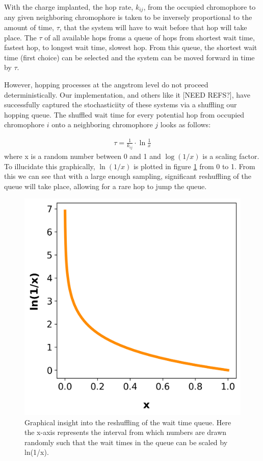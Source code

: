 With the charge implanted, the hop rate, $k_{ij}$, from the occupied chromophore to any
given neighboring chromophore is taken to be
inversely proportional to the amount of time, $\tau$, that the system will have to wait before that hop will
take place. The $\tau$ of all available hops froms a queue of hops from shortest wait time, fastest hop, to
longest wait time, slowest hop. From this queue, the shortest wait time (first choice) can be selected
and the system can be moved forward in time by $\tau$.

However, hopping processes at the angstrom level do not proceed deterministically. 
Our implementation, and others like it [NEED REFS?], have
successfully captured the stochasticiity of these systems via a shuffling our hopping queue.
The shuffled wait time for every potential hop from occupied chromophore $i$ onto a
neighboring chromophore $j$ looks as follows:

\begin{align}
    \tau = \frac{1}{k_{ij}} \cdot \ln{\frac{1}{x}} 
\end{align}
where x is a random number between 0 and 1 and $\log{(1/x)}$ is a scaling factor. To illucidate this
graphically, $\ln{(1/x)}$ is plotted in figure \ref{fig:ln} from 0 to 1. From this we can see that with
a large enough sampling, significant reshuffling of the queue will take place, allowing for a rare hop to jump
the queue.

\begin{figure}
  \center
  \includegraphics[width=0.8\linewidth]{figures/naturallog.png}
  \caption{Graphical insight into the reshuffling of the wait time queue. Here the x-axis represents the 
    interval from which numbers are drawn randomly such that the wait times in the queue can be scaled 
    by ln(1/x).}
  \label{fig:ln}
\end{figure}

